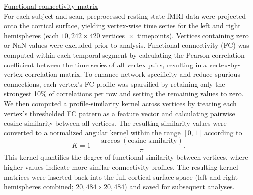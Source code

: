 \noindent\underline{Functional connectivity matrix}\label{subsec:FC} \hfill\\
For each subject and scan, preprocessed resting-state fMRI data were projected onto the cortical surface, yielding vertex-wise time series for the left and right hemispheres (each \(10{,}242 \times 420\) vertices~\(\times\)~timepoints). Vertices containing zero or NaN values were excluded prior to analysis. Functional connectivity (FC) was computed within each temporal segment by calculating the Pearson correlation coefficient between the time series of all vertex pairs, resulting in a vertex-by-vertex correlation matrix. To enhance network specificity and reduce spurious connections, each vertex’s FC profile was sparsified by retaining only the strongest 10\% of correlations per row and setting the remaining values to zero. We then computed a profile-similarity kernel across vertices by treating each vertex's thresholded FC pattern as a feature vector and calculating pairwise cosine similarity between all vertices. The resulting similarity values were converted to a normalized angular kernel within the range \([0,1]\) according to  
\[
K = 1 - \frac{\arccos(\text{cosine similarity})}{\pi}.
\]
This kernel quantifies the degree of functional similarity between vertices, where higher values indicate more similar connectivity profiles. The resulting kernel matrices were inserted back into the full cortical surface space (left and right hemispheres combined; \(20{,}484 \times 20{,}484\)) and saved for subsequent analyses.

